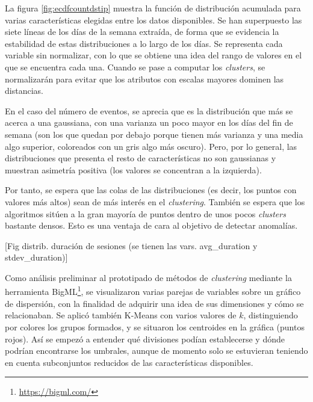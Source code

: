 La figura \ref{fig:ecdfcountdstip} muestra la función de distribución acumulada para varias características elegidas entre los datos disponibles.
Se han superpuesto las siete líneas de los días de la semana extraída, de forma que se evidencia la estabilidad de estas distribuciones a lo largo de los días.
Se representa cada variable sin normalizar, con lo que se obtiene una idea del rango de valores en el que se encuentra cada una.
Cuando se pase a computar los \emph{clusters}, se normalizarán para evitar que los atributos con escalas mayores dominen las distancias.

En el caso del número de eventos, se aprecia que es la distribución que más se acerca a una gaussiana, con una varianza un poco mayor en los días del fin de semana
(son los que quedan por debajo porque tienen más varianza y una media algo superior, coloreados con un gris algo más oscuro).
Pero, por lo general, las distribuciones que presenta el resto de características no son gaussianas y muestran asimetría positiva (los valores se concentran a la izquierda).

Por tanto, se espera que las colas de las distribuciones (es decir, los puntos con valores más altos) sean de más interés en el \emph{clustering}.
También se espera que los algoritmos sitúen a la gran mayoría de puntos dentro de unos pocos \emph{clusters} bastante densos.
Esto es una ventaja de cara al objetivo de detectar anomalías.

[Fig distrib. duración de sesiones (se tienen las vars. avg\_duration y stdev\_duration)]

Como análisis preliminar al prototipado de métodos de \emph{clustering} mediante la herramienta BigML\footnote{\url{https://bigml.com/}},
se visualizaron varias parejas de variables sobre un gráfico de dispersión, con la finalidad de adquirir una idea de sus dimensiones y cómo se relacionaban.
Se aplicó también K-Means con varios valores de $k$, distinguiendo por colores los grupos formados, y se situaron los centroides en la gráfica (puntos rojos).
Así se empezó a entender qué divisiones podían establecerse y dónde podrían encontrarse los umbrales,
aunque de momento solo se estuvieran teniendo en cuenta subconjuntos reducidos de las características disponibles.

